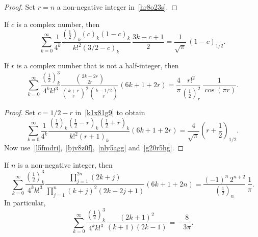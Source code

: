 \documentclass[12pt,reqno]{article}
\begin{document}
\begin{proof}
Set $r=n$ a non-negative integer in~\eqref{hr8o23s}.
\end{proof}
\begin{lemma}\label{nnoqyfq}
If $c$ is a complex number, then
\begin{equation}\label{k1x81g9}
\sum_{k = 0}^\infty  {\frac{1}{{4^k }}\frac{{\left( {\frac{1}{2}} \right)_k \left( c \right)_k \left( {1 - c} \right)_k }}{{k!^2 \left( {3/2 - c} \right)_k }}\,\frac{{3k - c + 1}}{2}}  = \frac{1}{{\sqrt \pi  }}\,(1-c)_{1/2}.
\end{equation}
\end{lemma}
\begin{theorem}
If $r$ is a complex number that is not a half-integer, then
\begin{equation}
\sum_{k = 0}^\infty  {\frac{{\left( {\frac{1}{2}} \right)_k^3 }}{{4^k k!^3 }}\frac{{\binom{{2k + 2r}}{{2r}}}}{{\binom{{k + r}}{r}^2 \binom{{k - 1/2}}{r}}}\left( {6k + 1 + 2r} \right)}  = \frac{4}{\pi }\frac{{r!^2 }}{{\left( {\frac{1}{2}} \right)_r^2 }}\,\frac{{1 }}{{\cos\left( {\pi r} \right)}}.
\end{equation}
\end{theorem}
\begin{proof}
Set $c=1/2-r$ in~\eqref{k1x81g9} to obtain
\begin{equation}\label{w4w5kv4}
\sum_{k = 0}^\infty  {\frac{1}{{4^k }}\frac{{\left( {\frac{1}{2}} \right)_k \left( {\frac{1}{2} - r} \right)_k \left( {\frac{1}{2} + r} \right)_k }}{{k!^2 \left( {r + 1} \right)_k }}\left( {6k + 1 + 2r} \right)}  = \frac{4}{{\sqrt \pi  }}\left( {r + \frac{1}{2}} \right)_{1/2} .
\end{equation}
Now use~\eqref{l5fmdri},~\eqref{bjv8z0f},~\eqref{nly5agg} and~\eqref{g20r5hg}.
\end{proof}
\begin{corollary}
If $n$ is a non-negative integer, then
\begin{equation*}
\sum_{k = 0}^\infty  {\frac{{\left( {\frac{1}{2}} \right)_k^3 }}{{4^k k!^3 }}\frac{{\prod_{j = 1}^{2n} {\left( {2k + j} \right)} }}{{\prod_{j = 1}^n {\left( {k + j} \right)^2 \left( {2k - 2j + 1} \right)} }}\left( {6k + 1 + 2n} \right)}  = \frac{{( - 1)^n\,2^{n+2} }}{{\left( {\frac{1}{2}} \right)_n }}\, \frac1{\pi }.
\end{equation*}
In particular,
\begin{equation}
\sum_{k = 0}^\infty  {\frac{{\left( {\frac{1}{2}} \right)_k^3 }}{{4^k k!^3 }}\frac{{\left( {2k + 1} \right)^2 }}{{\left( {k + 1} \right)\left( {2k - 1} \right)}}}  =  - \frac{8}{{3\pi }}.
\end{equation}
\end{corollary}
\end{document}
